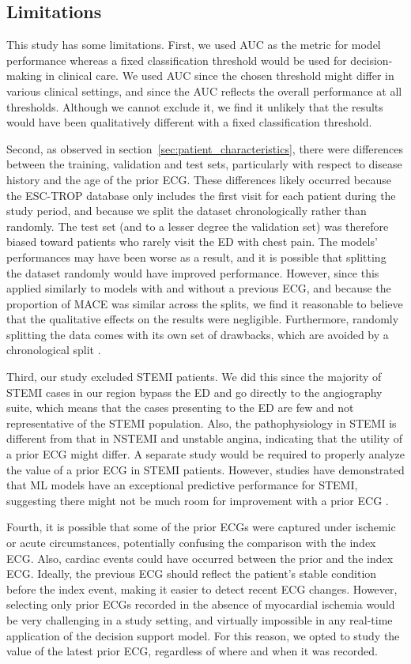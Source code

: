 \documentclass[preprint]{elsarticle}
\begin{document}
\subsection{Limitations}
This study has some limitations. First, we used AUC as the metric for model performance whereas a fixed classification threshold would be used for decision-making in clinical care. We used AUC since the chosen threshold might differ in various clinical settings, and since the AUC reflects the overall performance at all thresholds. Although we cannot exclude it, we find it unlikely that the results would have been qualitatively different with a fixed classification threshold.

Second, as observed in section~\ref{sec:patient_characteristics}, there were differences between the training, validation and test sets, particularly with respect to disease history and the age of the prior ECG. These differences likely occurred because the ESC-TROP database only includes the first visit for each patient during the study period, and because we split the dataset chronologically rather than randomly. The test set (and to a lesser degree the validation set) was therefore biased toward patients who rarely visit the ED with chest pain. The models' performances may have been worse as a result, and it is possible that splitting the dataset randomly would have improved performance. However, since this applied similarly to models with and without a previous ECG, and because the proportion of MACE was similar across the splits, we find it reasonable to believe that the qualitative effects on the results were negligible. Furthermore, randomly splitting the data comes with its own set of drawbacks, which are avoided by a chronological split \citep{steyerberg2009}.

Third, our study excluded STEMI patients. We did this since the majority of STEMI cases in our region bypass the ED and go directly to the angiography suite, which means that the cases presenting to the ED are few and not representative of the STEMI population. Also, the pathophysiology in STEMI is different from that in NSTEMI and unstable angina, indicating that the utility of a prior ECG might differ. A separate study would be required to properly analyze the value of a prior ECG in STEMI patients. However, studies have demonstrated that ML models have an exceptional predictive performance for STEMI, suggesting there might not be much room for improvement with a prior ECG \citep{gustafsson2022}.

Fourth, it is possible that some of the prior ECGs were captured under ischemic or acute circumstances, potentially confusing the comparison with the index ECG. Also, cardiac events could have occurred between the prior and the index ECG. Ideally, the previous ECG should reflect the patient's stable condition before the index event, making it easier to detect recent ECG changes. However, selecting only prior ECGs recorded in the absence of myocardial ischemia would be very challenging in a study setting, and virtually impossible in any real-time application of the decision support model. For this reason, we opted to study the value of the latest prior ECG, regardless of where and when it was recorded.
\end{document}
